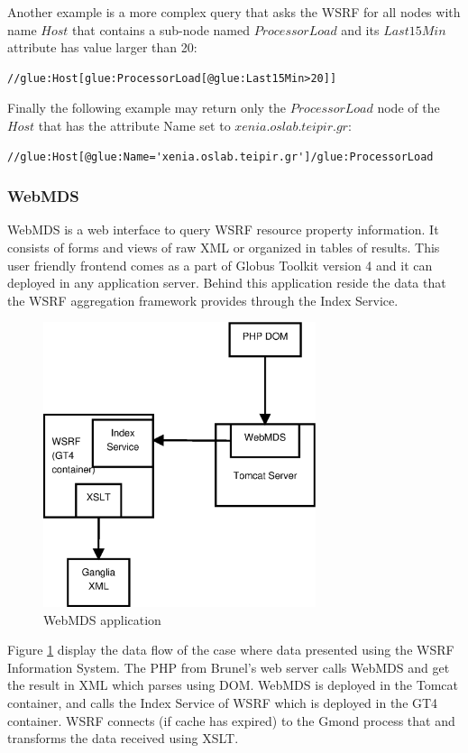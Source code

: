Another example is a more complex query that asks the WSRF for all nodes with name $Host$ that contains a sub-node named $ProcessorLoad$ and its $Last15Min$ attribute has value larger than 20:
\begin{lstlisting}
//glue:Host[glue:ProcessorLoad[@glue:Last15Min>20]]
\end{lstlisting}

Finally the following example may return only the $ProcessorLoad$ node of the $Host$ that has the attribute Name set to $xenia.oslab.teipir.gr$:
\begin{lstlisting}
//glue:Host[@glue:Name='xenia.oslab.teipir.gr']/glue:ProcessorLoad
\end{lstlisting}


\subsubsection{WebMDS}

WebMDS is a web interface to query WSRF resource property information. It consists of forms and views of raw XML or organized in tables of results. This user friendly frontend comes as a part of Globus Toolkit version 4 and it can deployed in any application server. Behind this application reside the data that the WSRF aggregation framework provides through the Index Service.

\begin{figure}[htb]
\centering
 \includegraphics[width=80mm]{images/webmds.eps}
\caption{WebMDS application}
\label{figure:webmds}
\end{figure}

Figure \ref{figure:webmds} display the data flow of the case where data presented using the WSRF Information System. The PHP from Brunel's web server calls WebMDS and get the result in XML which parses using DOM. WebMDS is deployed in the Tomcat container, and calls the Index Service of WSRF which is deployed in the GT4 container. WSRF connects (if cache has expired) to the Gmond process that and transforms the data received using XSLT.

